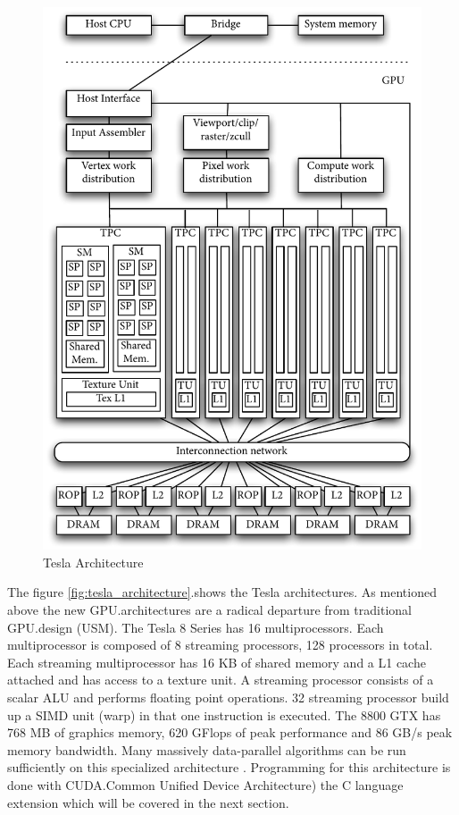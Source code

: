 \begin{figure}[ht]
\centering
\includegraphics[width=\textwidth]{gfx/tesla_architecture} 
\caption{Tesla Architecture} 
\label{fig:tesla_architecture} 
\end{figure} 

The figure \autoref{fig:tesla_architecture}.shows the Tesla architectures. As
mentioned above the new  \gls{GPU}.architectures are a radical departure
from traditional  \gls{GPU}.design (USM). The Tesla 8 Series has 16 multiprocessors. 
Each multiprocessor is composed of 8 streaming processors, 128 processors in 
total. Each streaming multiprocessor has 16 KB of shared memory
and a L1 cache attached and has access to a texture unit. A streaming processor
consists of a scalar ALU and performs floating point operations. 32 streaming
processor build up a SIMD unit (warp) in that one instruction is executed.
The 8800 GTX has 768 MB of graphics memory, 620 GFlops of peak performance and
86 GB/s peak memory bandwidth. Many massively data-parallel algorithms can be
run sufficiently on this specialized architecture \citep{citeulike:3145468}.
Programming for this architecture is done with \gls{CUDA}.Common Unified Device
Architecture) the C language extension which will be covered in the next
section.


